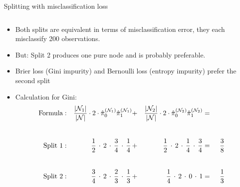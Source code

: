 \documentclass[11pt,compress,t,notes=noshow, xcolor=table]{beamer}
\begin{document}
\begin{vbframe}{Splitting with misclassification loss}
\begin{small}
\begin{columns}[T,onlytextwidth]
\begin{center}
\end{center}
\end{columns}
\end{small}

\lz

\begin{itemize}
\item Both splits are equivalent in terms of misclassification error, they each misclassify 200 observations. 
\item But: Split 2 produces one pure node and is probably preferable.
\item Brier loss (Gini impurity) and Bernoulli loss (entropy impurity) prefer the second split
\item Calculation for Gini:\\
\begin{alignat*}{6}
\text{Formula}&:& \frac{|\Nl|}{|\Np|}\cdot 2 \cdot\pikNlh[0]\pikNlh[1] &+& \frac{|\Nr|}{|\Np|}\cdot 2 \cdot \pikNrh[0]\pikNrh[1] &=& \\[5ex]
\text{Split 1}&:& \,\, \frac{1}{2} \,\cdot \, 2 \,\cdot\, \frac{3}{4} \,\cdot\, \frac{1}{4} \,&+&\,  \, \frac{1}{2} \,\cdot\, 2 \, \cdot\, \frac{1}{4} \,\cdot\, \frac{3}{4} &=&\;\, \frac{3}{8}\\[5ex]
\text{Split 2}&:& \frac{3}{4}\, \cdot\, 2 \,\cdot\,\frac{2}{3}\,\cdot\,\frac{1}{3}\, &+& \frac{1}{4} \,\cdot\, 2 \,\cdot\, 0 \,\cdot\, 1 &=&\; \,\frac{1}{3}
\end{alignat*}
\end{itemize}
\end{vbframe}

 
 




\endlecture
\end{document}
